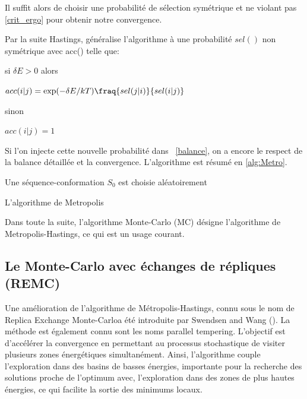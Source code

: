 Il suffit alors de choisir une probabilité de sélection symétrique et ne violant pas \ref{crit_ergo} pour obtenir notre convergence.


Par la suite Hastings, généralise l'algorithme à une probabilité $sel()$ non symétrique avec acc() telle que:


si
$\delta E >0$
alors

$acc(i|j) = \exp(- \delta E/kT) \fraq{sel(j|i)}{sel(i|j)}$

sinon

$acc(i|j)=1$


Si l'on injecte cette nouvelle probabilité dans ~\ref{balance}, on a encore le respect de la balance détaillée et la convergence. L'algorithme est résumé en \ref{alg:Metro}.


\begin{algorithm}
  \label{alg:Metro}
  Une séquence-conformation $S_0$ est choisie aléatoirement\;
\caption{L'algorithme de Metropolis}  
\end{algorithm}


Dans toute la suite, l'algorithme Monte-Carlo (MC) désigne l'algorithme de Metropolis-Hastings, ce qui est un usage courant.

\subsection{Le Monte-Carlo avec échanges de répliques (REMC)}


Une amélioration de l'algorithme de Métropolis-Hastings, connu sous le nom de \og Replica Exchange Monte-Carlo\fg a été introduite par Swendsen and Wang (\cite{Swendsen82}). La méthode est également connu sont les noms \og parallel tempering\fg. L'objectif est d'accélérer la convergence en permettant au processus stochastique de visiter plusieurs zones énergétiques simultanément. Ainsi, l'algorithme couple l'exploration dans des basins de basses énergies, importante pour la recherche des solutions proche de l'optimum avec, l'exploration dans des zones de plus hautes énergies, ce qui facilite la sortie des minimums locaux.

